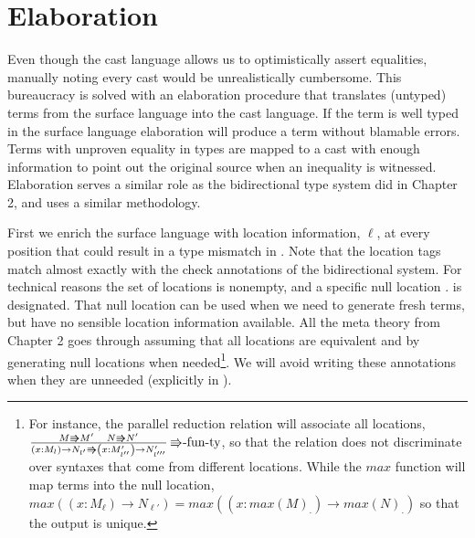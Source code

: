 \section{Elaboration}

Even though the cast language allows us to optimistically assert equalities, manually noting every cast would be unrealistically cumbersome.
This bureaucracy is solved with an elaboration procedure that translates (untyped) terms from the surface language into the cast language.
If the term is well typed in the surface language elaboration will produce a term without blamable errors.
Terms with unproven equality in types are mapped to a cast with enough information to point out the original source when an inequality is witnessed.
Elaboration serves a similar role as the bidirectional type system did in Chapter 2, and uses a similar methodology.

First we enrich the surface language with location information, $\ell$, at every position that could result in a type mismatch in .
Note that the location tags match almost exactly with the check annotations of the bidirectional system.
For technical reasons the set of locations is nonempty, and a specific null location $.$ is designated.
That null location can be used when we need to generate fresh terms, but have no sensible location information available.
All the meta theory from Chapter 2 goes through assuming that all locations are equivalent and by generating null locations when needed\footnote{
  For instance, the parallel reduction relation will associate all locations,
  $\frac{M\Rrightarrow M'\quad N\Rrightarrow N'}{\left(x:M_{l}\right)\rightarrow N_{l'}\Rrightarrow\left(x:M'_{l''}\right)\rightarrow N'_{l'''}}\,\textrm{\ensuremath{\Rrightarrow}-fun-ty}$,
  so that the relation does not discriminate over syntaxes that come from different locations.
  While the $max$ function will map terms into the null location, 
  $max\left(\left(x:M_{\ensuremath{\ell}}\right)\rightarrow N_{\ensuremath{\ell'}}\right)=max\left(\left(x:max\left(M\right)_{.}\right)\rightarrow max\left(N\right)_{.}\right)$
  so that the output is unique.}.
We will avoid writing these annotations when they are unneeded (explicitly in ).

